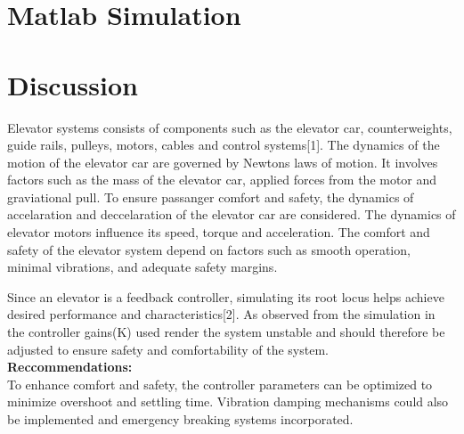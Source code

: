 \documentclass[10pt,a4paper]{report}
\begin{document}
\section{Matlab Simulation}

\pagebreak

\section{Discussion}

Elevator systems consists of components such as the elevator car, counterweights, guide rails, pulleys, motors, cables and control systems[1]. The dynamics of the motion of the elevator car are governed by Newtons laws of motion. It involves factors such as the mass of the elevator car, applied forces from the motor and graviational pull. To ensure passanger comfort and safety, the dynamics of accelaration and deccelaration of the elevator car are considered. The dynamics of elevator motors influence its speed, torque and acceleration. The comfort and safety of the elevator system depend on factors such as smooth operation, minimal vibrations, and adequate safety margins. 

Since an elevator is a feedback controller, simulating its root locus helps achieve desired performance and characteristics[2]. As observed from the simulation in the controller gains(K) used render the system unstable and should therefore be adjusted to ensure safety and comfortability of the system.\\
\textbf{Reccommendations:}\\
To enhance comfort and safety, the controller parameters can be optimized to minimize overshoot and settling time. Vibration damping mechanisms could also be implemented and emergency breaking systems incorporated.
\pagebreak
\end{document}

